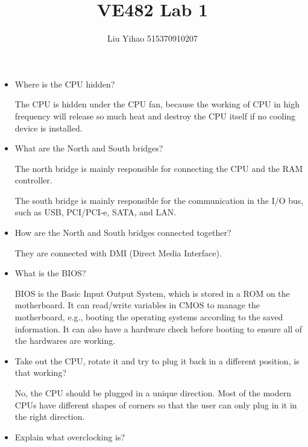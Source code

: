\documentclass{article}
\title{VE482 Lab 1}
\author{Liu Yihao 515370910207}
\date{}
\begin{document}
\maketitle

\begin{itemize}
\item Where is the CPU hidden?

The CPU is hidden under the CPU fan, because the working of CPU in high frequency will release so much heat and destroy the CPU itself if no cooling device is installed. 

\item What are the North and South bridges?

The north bridge is mainly responsible for connecting the CPU and the RAM controller.

The south bridge is mainly responsible for the communication in the I/O bus, such as USB, PCI/PCI-e, SATA, and LAN.

\item How are the North and South bridges connected together?

They are connected with DMI (Direct Media Interface).

\item What is the BIOS?

BIOS is the Basic Input Output System, which is stored in a ROM on the motherboard. It can read/write variables in CMOS to manage the motherboard, e.g., booting the operating systems according to the saved information. It can also have a hardware check before booting to ensure all of the hardwares are working.

\item Take out the CPU, rotate it and try to plug it back in a different position, is that working?

No, the CPU should be plugged in a unique direction. Most of the modern CPUs have different shapes of corners so that the user can only plug in it in the right direction.

\item Explain what overclocking is?



\end{itemize}
\end{document}
